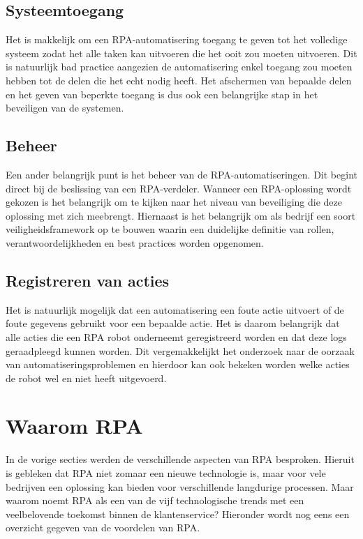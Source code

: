 \subsection{Systeemtoegang}
\label{subsec:systeemtoegang}

Het is makkelijk om een RPA-automatisering toegang te geven tot het volledige systeem zodat het alle taken kan uitvoeren die het ooit zou moeten uitvoeren. Dit is natuurlijk bad practice aangezien de automatisering enkel toegang zou moeten hebben tot de delen die het echt nodig heeft.
Het afschermen van bepaalde delen en het geven van beperkte toegang is dus ook een belangrijke stap in het beveiligen van de systemen.

\subsection{Beheer}
\label{subsec:beheer}

Een ander belangrijk punt is het beheer van de RPA-automatiseringen. Dit begint direct bij de beslissing van een RPA-verdeler. Wanneer een RPA-oplossing wordt gekozen is het belangrijk om te kijken naar het niveau van beveiliging die deze oplossing met zich meebrengt. Hiernaast is het belangrijk om als bedrijf een soort veiligheidsframework op te bouwen waarin een duidelijke definitie van rollen, verantwoordelijkheden en best practices worden opgenomen.

\subsection{Registreren van acties}
\label{subsec:registreren-van-acties}

Het is natuurlijk mogelijk dat een automatisering een foute actie uitvoert of de foute gegevens gebruikt voor een bepaalde actie. Het is daarom belangrijk dat alle acties die een RPA robot onderneemt geregistreerd worden en dat deze logs geraadpleegd kunnen worden. Dit vergemakkelijkt het onderzoek naar de oorzaak van automatiseringsproblemen en hierdoor kan ook bekeken worden welke acties de robot wel en niet heeft uitgevoerd.

\section{Waarom RPA}
\label{sec:waarom-rpa}

In de vorige secties werden de verschillende aspecten van RPA besproken. Hieruit is gebleken dat RPA niet zomaar een nieuwe technologie is, maar voor vele bedrijven een oplossing kan bieden voor verschillende langdurige processen. Maar waarom noemt \textcite{Fluss2020} RPA als een van de vijf technologische trends met een veelbelovende toekomst binnen de klantenservice? Hieronder wordt nog eens een overzicht gegeven van de voordelen van RPA.

